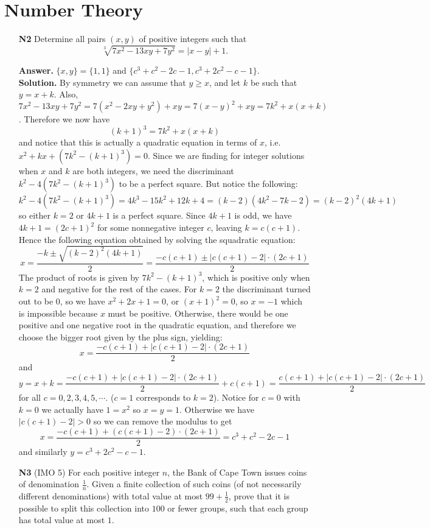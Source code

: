 \documentclass[11pt,a4paper]{article}
\begin{document}
\section*{Number Theory}
\begin{enumerate}
	\item [\textbf{N2}] Determine all pairs $(x, y)$ of positive integers such that \[\sqrt[3]{7x^2-13xy+7y^2}=|x-y|+1.\]
	
	\textbf{Answer.} $\{x, y\}=\{1, 1\}$ and $\{c^3+c^2-2c-1, c^3+2c^2-c-1\}$. \\
	\textbf{Solution.} By symmetry we can assume that $y\ge x$, and let $k$ be such that $y=x+k$. Also, $7x^2-13xy+7y^2=7(x^2-2xy+y^2)+xy=7(x-y)^2+xy=7k^2+x(x+k)$. Therefore we now have 
	\[(k+1)^3 = 7k^2+x(x+k)
	\]
	and notice that this is actually a quadratic equation in terms of $x$, i.e. $x^2+kx+(7k^2-(k+1)^3)=0$. Since we are finding for integer solutions when $x$ and $k$ are both integers, we need the discriminant $k^2-4(7k^2-(k+1)^3)$ to be a perfect square. But notice the following: 
	\[
	k^2-4(7k^2-(k+1)^3)=4k^3-15k^2+12k+4=(k-2)(4k^2-7k-2)=(k-2)^2(4k+1)
	\]
	so either $k=2$ or $4k+1$ is a perfect square. Since $4k+1$ is odd, we have $4k+1=(2c+1)^2$ for some nonnegative integer $c$, leaving $k=c(c+1)$. Hence the following equation obtained by solving the squadratic equation: 
	\[
	x=\frac{-k\pm \sqrt{(k-2)^2(4k+1)}}{2}
	=\frac{-c(c+1)\pm |c(c+1)-2|\cdot (2c+1)}{2}
	\]
	The product of roots is given by $7k^2-(k+1)^3$, which is positive only when $k=2$ and negative for the rest of the cases. For $k=2$ the discriminant turned out to be 0, so we have $x^2+2x+1=0$, or $(x+1)^2=0$, so $x=-1$ which is impossible because $x$ must be positive. Otherwise, there would be one positive and one negative root in the quadratic equation, and therefore we choose the bigger root given by the plus sign, yielding: 
	\[
	x=\frac{-c(c+1)+ |c(c+1)-2|\cdot (2c+1)}{2}\]
	and
	\[
	y=x+k = \frac{-c(c+1)+ |c(c+1)-2|\cdot (2c+1)}{2} + c(c+1) 
	=\frac{c(c+1)+ |c(c+1)-2|\cdot (2c+1)}{2}
	\]
	for all $c=0, 2, 3, 4, 5, \cdots $. ($c=1$ corresponds to $k=2$). Notice for $c=0$ with $k=0$ we actually have $1=x^2$ so $x=y=1$. Otherwise we have $|c(c+1)-2|>0$ so 
	we can remove the modulus to get 
	\[
	x=\frac{-c(c+1)+ (c(c+1)-2)\cdot (2c+1)}{2}=c^3+c^2-2c-1
	\]
	and similarly $y=c^3+2c^2-c-1$. 
	
	\item [\textbf{N3}] (IMO 5) For each positive integer $n$, the Bank of Cape Town issues coins of denomination $\frac1n$. Given a finite collection of such coins (of not necessarily different denominations) with total value at most $99+\frac12$, prove that it is possible to split this collection into $100$ or fewer groups, such that each group has total value at most $1$.
	

\end{enumerate}
\end{document}
